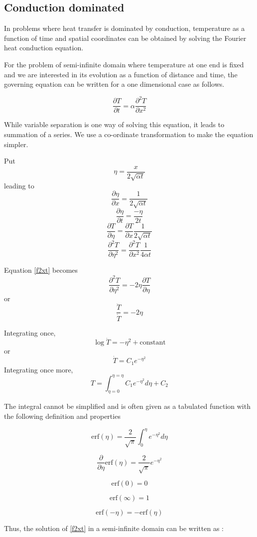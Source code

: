\subsection{Conduction dominated}

In problems where heat transfer is dominated by conduction, temperature as a
function of time and spatial coordinates can be obtained by solving the Fourier
heat conduction equation. 


For the problem of semi-infinite domain where temperature at one end is fixed
and we are interested in its evolution as a function of distance and time, the
governing equation can be written for a one dimensional case as follows.

$$
\label{f2xt}
\frac{\partial T}{\partial t} = \alpha \frac{\partial^2 T}{\partial x^2}
$$

While variable separation is one way of solving this equation, it leads to
summation of a series. We use a co-ordinate transformation to make the equation
simpler.

Put $$\eta = \frac{x}{2\sqrt{\alpha t}}$$ leading to
$$\frac{\partial \eta}{\partial x} = \frac{1}{2\sqrt{\alpha t}}$$
$$\frac{\partial \eta}{\partial t} = \frac{-\eta}{2t}$$
$$\frac{\partial T}{\partial \eta} = \frac{\partial T}{\partial x}
\frac{1}{2\sqrt{\alpha t}}$$
$$\frac{\partial^2 T}{\partial \eta^2} = \frac{\partial^2 T}{\partial x^2}
\frac{1}{4\alpha t}$$


Equation \ref{f2xt} becomes 
$$
\frac{\partial^2 T}{\partial \eta^2} = -2\eta \frac{\partial T}{\partial \eta}
$$
or
$$
\frac{\ddot{T}}{\dot{T}} = -2\eta
$$

Integrating once,
\\
$$
\log\dot{T} = -\eta^2 + \text{constant}
$$
or
$$
\dot{T} = C_1 e^{-\eta^2}
$$
Integrating once more,
$$
T = \int_{\eta=0}^{\eta=\eta}{C_1 e^{-\eta^2} d\eta} + C_2
$$

The integral cannot be simplified and is often given as a tabulated function
with the following definition and properties

$$
\text{erf}(\eta) = \frac{2}{\sqrt{\pi}} \int_{0}^{\eta}{e^{-\eta^2} d\eta}
$$


$$
\frac{\partial}{\partial \eta} \text{erf}(\eta) = \frac{2}{\sqrt{\pi}}
e^{-\eta^2}
$$

$$
\text{erf}(0) = 0
$$

$$
\text{erf}(\infty) = 1
$$

$$
\text{erf}(-\eta) = -\text{erf}(\eta)
$$

Thus, the solution of \ref{f2xt} in a semi-infinite domain can be written as :

